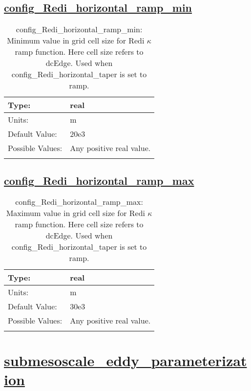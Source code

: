 \subsection[config\_Redi\_horizontal\_ramp\_min]{\hyperref[sec:nm_tab_Redi_isopycnal_mixing]{config\_Redi\_horizontal\_ramp\_min}}
\label{subsec:nm_sec_config_Redi_horizontal_ramp_min}
\begin{center}
\begin{longtable}{| p{2.0in} || p{4.0in} |}
    \hline
    Type: & real \\
    \hline
    Units: & \si{m} \\
    \hline
    Default Value: & 20e3 \\
    \hline
    Possible Values: & Any positive real value. \\
    \hline
    \caption{config\_Redi\_horizontal\_ramp\_min: Minimum value in grid cell size for Redi $\kappa$ ramp function.  Here cell size refers to dcEdge. Used when config\_Redi\_horizontal\_taper is set to ramp.}
\end{longtable}
\end{center}
\subsection[config\_Redi\_horizontal\_ramp\_max]{\hyperref[sec:nm_tab_Redi_isopycnal_mixing]{config\_Redi\_horizontal\_ramp\_max}}
\label{subsec:nm_sec_config_Redi_horizontal_ramp_max}
\begin{center}
\begin{longtable}{| p{2.0in} || p{4.0in} |}
    \hline
    Type: & real \\
    \hline
    Units: & \si{m} \\
    \hline
    Default Value: & 30e3 \\
    \hline
    Possible Values: & Any positive real value. \\
    \hline
    \caption{config\_Redi\_horizontal\_ramp\_max: Maximum value in grid cell size for Redi $\kappa$ ramp function.  Here cell size refers to dcEdge. Used when config\_Redi\_horizontal\_taper is set to ramp.}
\end{longtable}
\end{center}
\section[submesoscale\_eddy\_parameterization]{\hyperref[sec:nm_tab_submesoscale_eddy_parameterization]{submesoscale\_eddy\_parameterization}}
\label{sec:nm_sec_submesoscale_eddy_parameterization}
